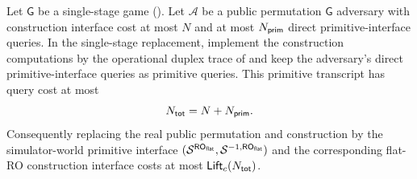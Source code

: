 \begin{lemma}
\label{lem:lift-bound}
Let $\mathsf{G}$ be a single-stage \TW{} game
(). Let
$\mathcal{A}$ be a
public permutation $\mathsf{G}$ adversary with construction interface
cost at most $N$ and at most $N_{\mathsf{prim}}$ direct primitive-interface
queries. In the \cite{BDPV08} single-stage replacement, implement the
\TW{} construction computations by the operational duplex trace of
 and keep the adversary's direct
primitive-interface queries as primitive queries. This primitive
transcript has \cite{BDPV08} query cost at most
\[
  N_{\mathsf{tot}} = N + N_{\mathsf{prim}} .
\]
Consequently replacing the real public permutation and \TW{} construction
by the simulator-world primitive interface
$(\mathcal{S}^{\mathsf{RO}_{\mathsf{flat}}},\mathcal{S}^{-1,\mathsf{RO}_{\mathsf{flat}}})$ and the corresponding flat-RO
construction interface costs at most $\mathsf{Lift}_c(N_{\mathsf{tot}})$.
\end{lemma}

